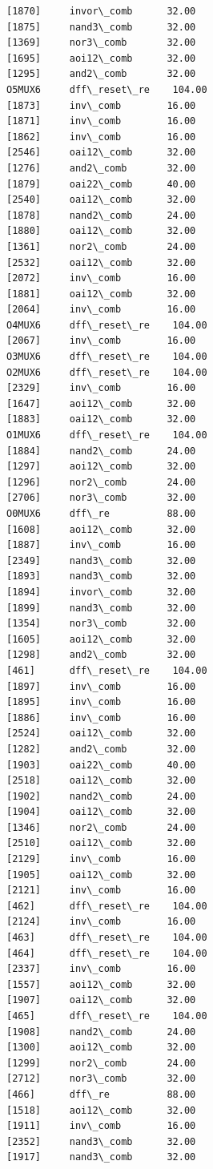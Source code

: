 \documentclass[a4paper,titlepage]{book}
\begin{document}
\begin{lstlisting}
[1870]     invor\_comb      32.00	
[1875]     nand3\_comb      32.00	
[1369]     nor3\_comb       32.00	
[1695]     aoi12\_comb      32.00	
[1295]     and2\_comb       32.00	
O5MUX6     dff\_reset\_re    104.00	
[1873]     inv\_comb        16.00	
[1871]     inv\_comb        16.00	
[1862]     inv\_comb        16.00	
[2546]     oai12\_comb      32.00	
[1276]     and2\_comb       32.00	
[1879]     oai22\_comb      40.00	
[2540]     oai12\_comb      32.00	
[1878]     nand2\_comb      24.00	
[1880]     oai12\_comb      32.00	
[1361]     nor2\_comb       24.00	
[2532]     oai12\_comb      32.00	
[2072]     inv\_comb        16.00	
[1881]     oai12\_comb      32.00	
[2064]     inv\_comb        16.00	
O4MUX6     dff\_reset\_re    104.00	
[2067]     inv\_comb        16.00	
O3MUX6     dff\_reset\_re    104.00	
O2MUX6     dff\_reset\_re    104.00	
[2329]     inv\_comb        16.00	
[1647]     aoi12\_comb      32.00	
[1883]     oai12\_comb      32.00	
O1MUX6     dff\_reset\_re    104.00	
[1884]     nand2\_comb      24.00	
[1297]     aoi12\_comb      32.00	
[1296]     nor2\_comb       24.00	
[2706]     nor3\_comb       32.00	
O0MUX6     dff\_re          88.00	
[1608]     aoi12\_comb      32.00	
[1887]     inv\_comb        16.00	
[2349]     nand3\_comb      32.00	
[1893]     nand3\_comb      32.00	
[1894]     invor\_comb      32.00	
[1899]     nand3\_comb      32.00	
[1354]     nor3\_comb       32.00	
[1605]     aoi12\_comb      32.00	
[1298]     and2\_comb       32.00	
[461]      dff\_reset\_re    104.00	
[1897]     inv\_comb        16.00	
[1895]     inv\_comb        16.00	
[1886]     inv\_comb        16.00	
[2524]     oai12\_comb      32.00	
[1282]     and2\_comb       32.00	
[1903]     oai22\_comb      40.00	
[2518]     oai12\_comb      32.00	
[1902]     nand2\_comb      24.00	
[1904]     oai12\_comb      32.00	
[1346]     nor2\_comb       24.00	
[2510]     oai12\_comb      32.00	
[2129]     inv\_comb        16.00	
[1905]     oai12\_comb      32.00	
[2121]     inv\_comb        16.00	
[462]      dff\_reset\_re    104.00	
[2124]     inv\_comb        16.00	
[463]      dff\_reset\_re    104.00	
[464]      dff\_reset\_re    104.00	
[2337]     inv\_comb        16.00	
[1557]     aoi12\_comb      32.00	
[1907]     oai12\_comb      32.00	
[465]      dff\_reset\_re    104.00	
[1908]     nand2\_comb      24.00	
[1300]     aoi12\_comb      32.00	
[1299]     nor2\_comb       24.00	
[2712]     nor3\_comb       32.00	
[466]      dff\_re          88.00	
[1518]     aoi12\_comb      32.00	
[1911]     inv\_comb        16.00	
[2352]     nand3\_comb      32.00	
[1917]     nand3\_comb      32.00	

\end{lstlisting}
\end{document}
